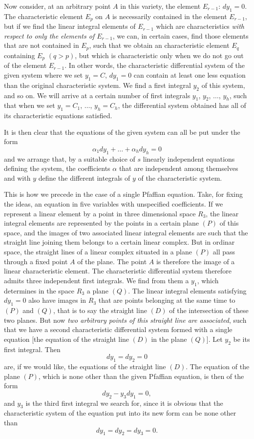 \documentclass[leqno,11pt]{book}
\theoremstyle{shape1}
\theoremstyle{shapesmall}
\begin{document}
Now consider, at an arbitrary point $A$ in this variety, the element $E_{r-1}$: $dy_{1}=0$. The characteristic element $E_{p}$ on $A$ is necessarily contained in the element $E_{r-1}$, but if we find the linear integral elements of $E_{r-1}$ which are characteristics \emph{with respect to only the elements of $E_{r-1}$}, we can, in certain cases, find those elements that are not contained in $E_{p}$, such that we obtain an characteristic element $E_{q}$ containing $E_{p}$ $(q>p)$, but which is characteristic only when we do not go out of the element $E_{r-1}$. In other words, the characteristic differential system of the given system where we set $y_{1}=C$, $dy_{1}=0$ can contain at least one less equation than the original characteristic system. We find a first integral $y_{2}$ of this system, and so on. We will arrive at a certain number of first integrals $y_{1}$, $y_{2}$, $\dots$, $y_{h}$, such that when we set $y_{1}=C_{1}$, $\dots$, $y_{h}=C_{h}$, the differential system obtained has all of its characteristic equations satisfied.

It is then clear that the equations of the given system can all be put under the form
\[
\alpha_{1}dy_{1}+\dots+\alpha_{h}dy_{h}=0
\]
and we arrange that, by a suitable choice of $s$ linearly independent equations defining the system, the coefficients $\alpha$ that are independent among themselves and with $y$ define the different integrals of $y$ of the characteristic system.

This is how we precede in the case of a single Pfaffian equation. Take, for fixing the ideas, an equation in five variables with unspecified coefficients. If we represent a linear element by a point in three dimensional space $R_{3}$, the linear integral elements are represented by the points in a certain plane $(P)$ of this space, and the images of two associated linear integral elements are such that the straight line joining them belongs to a certain linear complex. But in ordinar space, the straight lines of a linear complex situated in a plane $(P)$ all pass through a fixed point $A$ of the plane. The point $A$ is therefore the image of a linear characteristic element. The characteristic differential system therefore admits three independent first integrals. We find from them a $y_{1}$, which determines in the space $R_{3}$ a plane $(Q)$. The linear integral elements satisfying $dy_{1}=0$ also have images in $R_{3}$ that are points belonging at the same time to $(P)$ and $(Q)$, that is to say the straight line $(D)$ of the intersection of these two planes. But now \emph{two arbitrary points of this straight line are associated}, such that we have a second characteristic differential system formed with a single equation [the equation of the straight line $(D)$ in the plane $(Q)$]. Let $y_{2}$ be its first integral. Then
\[
dy_{1}=dy_{2}=0
\]
are, if we would like, the equations of the straight line $(D)$. The equation of the plane $(P)$, which is none other than the given Pfaffian equation, is then of the form
\[
dy_{2}-y_{3}dy_{1}=0,
\]
and $y_{3}$ is the third first integral we search for, since it is obvious that the characteristic system of the equation put into its new form can be none other than
\[
dy_{1}=dy_{2}=dy_{3}=0.
\]
\end{document}
